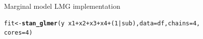 \documentclass[11pt,a4paper,twoside]{book}\usepackage[]{graphicx}\usepackage[]{color}
\makeatletter
\newcommand{\hlnum}[1]{\textcolor[rgb]{0.686,0.059,0.569}{#1}}%
\newcommand{\hlopt}[1]{\textcolor[rgb]{0,0,0}{#1}}%
\newcommand{\hlstd}[1]{\textcolor[rgb]{0.345,0.345,0.345}{#1}}%
\newcommand{\hlkwb}[1]{\textcolor[rgb]{0.69,0.353,0.396}{#1}}%
\newcommand{\hlkwc}[1]{\textcolor[rgb]{0.333,0.667,0.333}{#1}}%
\newcommand{\hlkwd}[1]{\textcolor[rgb]{0.737,0.353,0.396}{\textbf{#1}}}%
\newenvironment{kframe}{%
 \def\at@end@of@kframe{}%
 \ifinner\ifhmode%
  \def\at@end@of@kframe{\end{minipage}}%
  \begin{minipage}{\columnwidth}%
 \fi\fi%
 \def\FrameCommand##1{\hskip\@totalleftmargin \hskip-\fboxsep
 \colorbox{shadecolor}{##1}\hskip-\fboxsep
     \hskip-\linewidth \hskip-\@totalleftmargin \hskip\columnwidth}%
 \MakeFramed {\advance\hsize-\width
   \@totalleftmargin\z@ \linewidth\hsize
   \@setminipage}}%
 {\par\unskip\endMakeFramed%
 \at@end@of@kframe}
\newenvironment{knitrout}{}{} %
\makeatother
\begin{document}
	\vspace{15mm}
	
			\begin{codeenv}
		
\caption{Marginal model LMG implementation}\label{r04:model.ri}
\begin{knitrout}
\color{fgcolor}\begin{kframe}
\begin{alltt}
\hlstd{fit} \hlkwb{<-} \hlkwd{stan_glmer}\hlstd{(y} \hlopt{~} \hlstd{x1} \hlopt{+} \hlstd{x2} \hlopt{+} \hlstd{x3} \hlopt{+} \hlstd{x4} \hlopt{+} \hlstd{(}\hlnum{1} \hlopt{|} \hlstd{sub),} \hlkwc{data} \hlstd{= df,} \hlkwc{chains} \hlstd{=} \hlnum{4}\hlstd{,}
    \hlkwc{cores} \hlstd{=} \hlnum{4}\hlstd{)}
\end{alltt}
\end{kframe}
\end{knitrout}
	\end{codeenv}
	
				\vspace{15mm}
	
\end{document}
